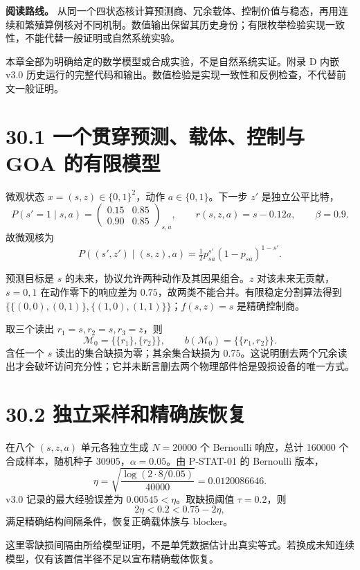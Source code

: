\documentclass[
  11pt,
  oneside]{book}
\begin{document}
\textbf{阅读路线。} 从同一个四状态核计算预测商、冗余载体、控制价值与稳态，再用连续和繁殖算例核对不同机制。数值输出保留其历史身份；有限枚举检验实现一致性，不能代替一般证明或自然系统实验。

本章全部为明确给定的数学模型或合成实验，不是自然系统实证。附录 D 内嵌 v3.0 历史运行的完整代码和输出。数值检验是实现一致性和反例检查，不代替前文一般证明。

\section{30.1 一个贯穿预测、载体、控制与 GOA 的有限模型}\label{ux4e00ux4e2aux8d2fux7a7fux9884ux6d4bux8f7dux4f53ux63a7ux5236ux4e0e-goa-ux7684ux6709ux9650ux6a21ux578b}

微观状态 \(x=(s,z)\in\{0,1\}^2\)，动作 \(a\in\{0,1\}\)。下一步 \(z'\) 是独立公平比特， \[P(s'=1\mid s,a)=
\begin{pmatrix}
0.15&0.85\\
0.90&0.85
\end{pmatrix}_{s,a},
\qquad r(s,z,a)=s-0.12a,\qquad\beta=0.9.\] 故微观核为 \[P((s',z')\mid(s,z),a)=\tfrac12
p_{sa}^{s'}(1-p_{sa})^{1-s'}.\]

预测目标是 \(s\) 的未来，协议允许两种动作及其因果组合。\(z\) 对该未来无贡献，\(s=0,1\) 在动作零下的响应差为 \(0.75\)，故两类不能合并。有限稳定分割算法得到 \(\{\{(0,0),(0,1)\},\{(1,0),(1,1)\}\}\)；\(f(s,z)=s\) 是精确控制商。

取三个读出 \(r_1=s,r_2=s,r_3=z\)，则 \[\mathcal M_0=\{\{r_1\},\{r_2\}\},\qquad
b(\mathcal M_0)=\{\{r_1,r_2\}\}.\] 含任一个 \(s\) 读出的集合缺损为零；其余集合缺损为 \(0.75\)。这说明删去两个冗余读出才会破坏访问充分性；它并未断言删去两个物理部件恰是毁损设备的唯一方式。

\section{30.2 独立采样和精确族恢复}\label{ux72ecux7acbux91c7ux6837ux548cux7cbeux786eux65cfux6062ux590d}

在八个 \((s,z,a)\) 单元各独立生成 \(N=20000\) 个 Bernoulli 响应，总计 160000 个合成样本，随机种子 30905，\(\alpha=0.05\)。由 P-STAT-01 的 Bernoulli 版本， \[\eta=\sqrt{\frac{\log(2\cdot8/0.05)}{40000}}
=0.0120086646.\] v3.0 记录的最大经验误差为 \(0.00545<\eta\)。取缺损阈值 \(\tau=0.2\)，则 \[2\eta<0.2<0.75-2\eta,\] 满足精确结构间隔条件，恢复正确载体族与 blocker。

这里零缺损间隔由所给模型证明，不是单凭数据估计出真实等式。若换成未知连续模型，仅有该置信半径不足以宣布精确载体恢复。
\end{document}
